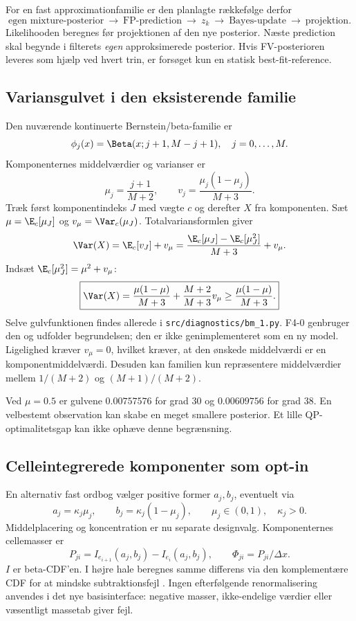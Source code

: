 For en fast approximationfamilie er den planlagte rækkefølge derfor
\[
 \text{egen mixture-posterior}\ \to\ \text{FP-prediction}\ \to\ z_k
 \ \to\ \text{Bayes-update}\ \to\ \text{projektion}.
\]
Likelihooden beregnes før projektionen af den nye posterior. Næste prediction skal begynde i filterets \emph{egen} approksimerede posterior. Hvis FV-posterioren leveres som hjælp ved hvert trin, er forsøget kun en statisk best-fit-reference.

\subsection{Variansgulvet i den eksisterende familie}
Den nuværende kontinuerte Bernstein/beta-familie er
\begin{equation}
 \phi_j(x)=\Beta(x;j+1,M-j+1),\quad j=0,\ldots,M.
 \label{eq:bernstein}
\end{equation}
Komponenternes middelværdier og varianser er
\[
 \mu_j=\frac{j+1}{M+2},\qquad v_j=\frac{\mu_j(1-\mu_j)}{M+3}.
\]
Træk først komponentindeks \(J\) med vægte \(c\) og derefter \(X\) fra komponenten. Sæt \(\mu=\E_c[\mu_J]\) og \(v_\mu=\Var_c(\mu_J)\). Totalvariansformlen giver
\[
 \Var(X)=\E_c[v_J]+v_\mu
 =\frac{\E_c[\mu_J]-\E_c[\mu_J^2]}{M+3}+v_\mu.
\]
Indsæt \(\E_c[\mu_J^2]=\mu^2+v_\mu\):
\begin{equation}
 \boxed{\Var(X)=\frac{\mu(1-\mu)}{M+3}
       +\frac{M+2}{M+3}v_\mu
       \geq\frac{\mu(1-\mu)}{M+3}.}
 \label{eq:variancefloor}
\end{equation}
Selve gulvfunktionen findes allerede i \texttt{src/diagnostics/bm\_1.py}. F4-0 genbruger den og udfolder begrundelsen; den er ikke genimplementeret som en ny model. Ligelighed kræver \(v_\mu=0\), hvilket kræver, at den ønskede middelværdi er en komponentmiddelværdi. Desuden kan familien kun repræsentere middelværdier mellem \(1/(M+2)\) og \((M+1)/(M+2)\).

Ved \(\mu=0.5\) er gulvene \(0.00757576\) for grad 30 og \(0.00609756\) for grad 38. En velbestemt observation kan skabe en meget smallere posterior. Et lille QP-optimalitetsgap kan ikke ophæve denne begrænsning.

\subsection{Celleintegrerede komponenter som opt-in}
En alternativ fast ordbog vælger positive former \(a_j,b_j\), eventuelt via
\begin{equation}
 a_j=\kappa_j\mu_j,\qquad b_j=\kappa_j(1-\mu_j),\qquad
 \mu_j\in(0,1),\quad\kappa_j>0.
 \label{eq:betadictionary}
\end{equation}
Middelplacering og koncentration er nu separate designvalg. Komponenternes cellemasser er
\begin{equation}
 P_{ji}=I_{e_{i+1}}(a_j,b_j)-I_{e_i}(a_j,b_j),\qquad
 \Phi_{ji}=P_{ji}/\Delta x.
 \label{eq:integratedbasis}
\end{equation}
\(I\) er beta-CDF'en. I højre hale beregnes samme differens via den komplementære CDF for at mindske subtraktionsfejl \cite{scipybeta}. Ingen efterfølgende renormalisering anvendes i det nye basisinterface: negative masser, ikke-endelige værdier eller væsentligt massetab giver fejl.

